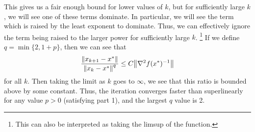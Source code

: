 \begin{solution}
    \newpage
    This gives us a fair enough bound for lower values of $k$, but for sufficiently large $k$, we will see one of these terms dominate. In particular, we will see the term which is raised by the least exponent to dominate. Thus, we can effectively ignore the term being raised to the larger power for sufficiently large $k$. \footnote{This can also be interpreted as taking the limsup of the function.} If we define $q = \min \{ 2, 1 + p \}$, then we can see that 
    \[\frac{\norm{x_{k+1} - x^{*}}}{\norm{x_k - x^{*}}^q} \leq C\norm{\nabla^2f(x^{*})^{-1}}\]
    for all $k$. Then taking the limit as $k$ goes to $\infty$, we see that this ratio is bounded above by some constant. Thus, the iteration converges faster than superlinearly for any value $p > 0$ (satisfying part 1), and the largest $q$ value is 2.
\end{solution}
